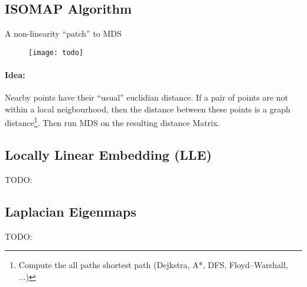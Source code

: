 \subsection{ISOMAP Algorithm}
A non-linearity ``patch'' to MDS

\begin{figure}[H]
	\centering
	\texttt{[image: todo]}
\end{figure}

\paragraph{Idea:} Nearby points have their ``usual'' euclidian distance. If a pair of points are not within a local neigbourhood, then the distance between these points is a graph distance\footnote{Compute the all paths shortest path (Dejkstra, A*,  DFS, Floyd–Warshall, ...)}. Then run MDS on the resulting distance Matrix.

\subsection{Locally Linear Embedding (LLE)}
TODO:

\subsection{Laplacian Eigenmaps}
TODO:
